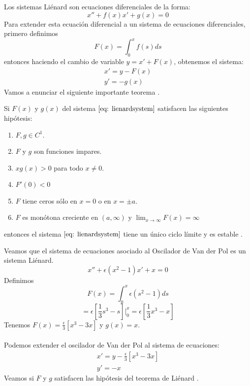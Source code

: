 Los sistemas Liénard son ecuaciones diferenciales de la forma:
\begin{equation}\label{eq: lienard}
	x''+f(x)x'+g(x)=0
\end{equation}
Para extender esta ecuación diferencial a un sistema de ecuaciones diferenciales, primero definimos
$$F(x)=\int_0^x f(s)ds$$
entonces haciendo el cambio de variable $y=x'+F(x)$, obtenemos el sistema:
\begin{equation}\label{eq: lienardsystem}
	\begin{matrix}
		x'=y-F(x) \\
		y'=-g(x)
	\end{matrix}
\end{equation}
Vamos a enunciar el siguiente importante teorema \cite{lienard1928oscillations}.
\begin{theorem}[Liénard]
	Si $F(x)$ y $g(x)$ del sistema $\eqref{eq: lienardsystem}$ satisfacen las siguientes hipótesis:
	\begin{enumerate}
		\item $F,g\in C^1$.
		\item $F$ y $g$ son funciones impares.
		\item $xg(x)>0$ para todo $x\neq 0$.
		\item $F'(0)<0$
		\item $F$ tiene ceros sólo en $x=0$ o en $x=\pm a$.
		\item $F$ es monótona creciente en $(a,\infty)$ y $\lim_{x\to\infty}F(x)=\infty$
	\end{enumerate}
	entonces el sistema $\eqref{eq: lienardsystem}$ tiene un único ciclo límite y es estable \cite{perko2001differential}.
\end{theorem}
Veamos que el sistema de ecuaciones asociado al Oscilador de Van der Pol es un sistema Liénard.
$$x''+\epsilon(x^2-1)x'+x=0$$
Definimos
$$F(x)=\int_0^x \epsilon(s^2-1)ds$$
$$=\epsilon[\frac{1}{3}s^3-s]\big|_0^x=\epsilon[\frac{1}{3}x^3-x]$$
Tenemos $F(x)=\frac{\epsilon}{3}[x^3-3x]$ y $g(x)=x$.\\
\\Podemos extender el oscilador de Van der Pol al sistema de ecuaciones:
$$
	\begin{matrix}
		x'=y-\frac{\epsilon}{3}[x^3-3x] \\
		y'=-x
	\end{matrix}
$$
Veamos si $F$ y $g$ satisfacen las hipótesis del teorema de Liénard \cite{guckenheimer1983nonlinear}.

